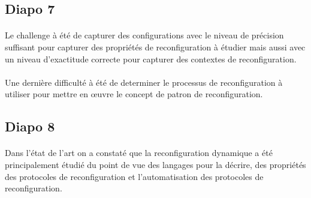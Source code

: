 \subsection{Diapo 7}

\paragraph{}
Le challenge à été de capturer des configurations avec le niveau de
précision suffisant pour capturer des propriétés de reconfiguration à
étudier mais aussi avec un niveau d'exactitude correcte pour capturer
des contextes de reconfiguration. 

\paragraph{}
Une dernière difficulté à été de determiner le processus de
reconfiguration à utiliser pour mettre en \oe{}uvre le concept de patron de
reconfiguration.

\subsection{Diapo 8} 
\paragraph{} 
Dans l'état de l'art on a constaté que la reconfiguration dynamique a
été principalement étudié du point de vue des langages pour la
décrire, des propriétés des protocoles de reconfiguration et
l'automatisation des protocoles de reconfiguration. 
